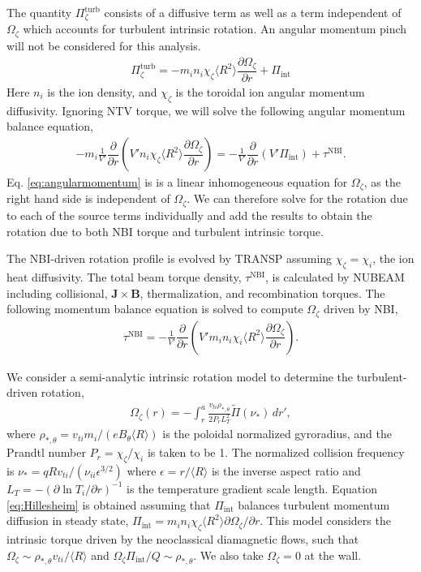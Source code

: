\documentclass[aip, pop, preprint]{revtex4-1}
\numberwithin{figure}{section}
\numberwithin{equation}{section}
\newcommand{\partder}[2]{\dfrac{\partial  #1}{\partial  #2}} %
\begin{document}
The quantity $\Pi_{\zeta}^{\text{turb}}$ consists of a diffusive term as well as a term independent of $\Omega_{\zeta}$ which accounts for turbulent intrinsic rotation. An angular momentum pinch will not be considered for this analysis. 
\begin{gather}
\Pi_{\zeta}^{\text{turb}} = -m_i n_i \chi_{\zeta} \langle R^2 \rangle \partder{\Omega_{\zeta}}{r} + \Pi_{\text{int}}
\end{gather}
Here $n_i$ is the ion density, and $\chi_{\zeta}$ is the toroidal ion angular momentum diffusivity. Ignoring NTV torque, we will solve the following angular momentum balance equation,
\begin{gather}
-m_i \frac{1}{V'} \partder{}{r} \left( V' n_i \chi_{\zeta} \langle R^2 \rangle \partder{\Omega_{\zeta}}{r} \right) =  -\frac{1}{V'} \partder{}{r} \left( V' \Pi_{\text{int}} \right) + \tau^{\text{NBI}}.
\label{eq:angularmomentum}
\end{gather}
Eq. \ref{eq:angularmomentum} is is a linear inhomogeneous equation for $\Omega_{\zeta}$, as the right hand side is independent of $\Omega_{\zeta}$. We can therefore solve for the rotation due to each of the source terms individually and add the results to obtain the rotation due to both NBI torque and turbulent intrinsic torque. 

The NBI-driven rotation profile is evolved by TRANSP assuming $\chi_{\zeta} = \chi_{i}$, the ion heat diffusivity. The total beam torque density, $\tau^{\text{NBI}}$, is calculated by NUBEAM including collisional, $\bm{J} \times \bm{B}$, thermalization, and recombination torques. The following momentum balance equation is solved to compute $\Omega_{\zeta}$ driven by NBI,
\begin{gather}
\tau^{\text{NBI}} = -\frac{1}{V'} \partder{}{r} \left( V' m_i n_i \chi_{i} \langle R^2 \rangle \partder{\Omega_{\zeta}}{r} \right).
\end{gather} 

We consider a semi-analytic intrinsic rotation model to determine the turbulent-driven rotation,\cite{Hillesheim2015}
\begin{gather}
\Omega_{\zeta}(r) = - \int_{r}^a \frac{v_{ti} \rho_{*,\theta}} {2 P_r L_T^2} \widetilde{\Pi} (\nu_*) \, d r',
\label{eq:Hillesheim}
\end{gather} 
where $\rho_{*,\theta} = v_{ti} m_i/(e B_{\theta} \langle R \rangle)$ is the poloidal normalized gyroradius, and the Prandtl number $P_r = \chi_{\zeta}/\chi_i$ is taken to be 1. The normalized collision frequency is $\nu_* = q R v_{ti}/(\nu_{ii} \epsilon^{3/2})$ where $\epsilon = r/\langle R \rangle$ is the inverse aspect ratio and $L_T = - \left( \partial \ln T_i/ \partial r \right)^{-1}$ is the temperature gradient scale length. Equation \ref{eq:Hillesheim} is obtained assuming that $\Pi_{\text{int}}$ balances turbulent momentum diffusion in steady state, $\Pi_{\text{int}} = m_i n_i \chi_{\zeta} \langle R^2 \rangle \partial \Omega_{\zeta}/\partial r$. This model considers the intrinsic torque driven by the neoclassical diamagnetic flows, such that $\Omega_{\zeta} \sim \rho_{*,\theta} v_{ti}/\langle R \rangle$ and $\Omega_{\zeta} \Pi_{\text{int}}/Q \sim \rho_{*, \theta}$. We also take $\Omega_{\zeta} = 0$ at the wall. 
\end{document}
